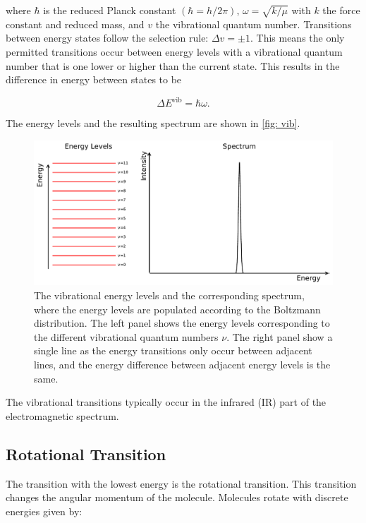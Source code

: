 \documentclass[oneside, single, authoryear, semicolon, 12pt]{lion-msc}
\newcommand{\4}{$_4$}
\newcommand{\3}{$_3$}
\newcommand{\2}{$_2$}
\begin{document}
where $\hbar$ is the reduced Planck constant $\left(\hbar=h/2\pi\right)$, $\omega=\sqrt{k/\mu}$ with $k$ the force constant and \textmu  reduced mass, and $v$ the vibrational quantum number. Transitions between energy states follow the selection rule: $\Delta v=\pm 1$. This means the only permitted transitions occur between energy levels with a vibrational quantum number that is one lower or higher than the current state. This results in the difference in energy between states to be

\begin{equation}
    \Delta E^{\mathrm{vib}}=\hbar\omega.
\end{equation}

The energy levels and the resulting spectrum are shown in \autoref{fig: vib}.

\begin{figure}[H]
    \centering
    \includegraphics[width=0.9\linewidth]{Figures/VibSpectrum.pdf}
    \caption{The vibrational energy levels and the corresponding spectrum, where the energy levels are populated according to the Boltzmann distribution. The left panel shows the energy levels corresponding to the different vibrational quantum numbers $\nu$. The right panel show a single line as the energy transitions only occur between adjacent lines, and the energy difference between adjacent energy levels is the same.}
    \label{fig: vib}
\end{figure}

The vibrational transitions typically occur in the infrared (IR) part of the electromagnetic spectrum. 


\subsection{Rotational Transition}
The transition with the lowest energy is the rotational transition. This transition changes the angular momentum of the molecule. Molecules rotate with discrete energies given by:
\end{document}
